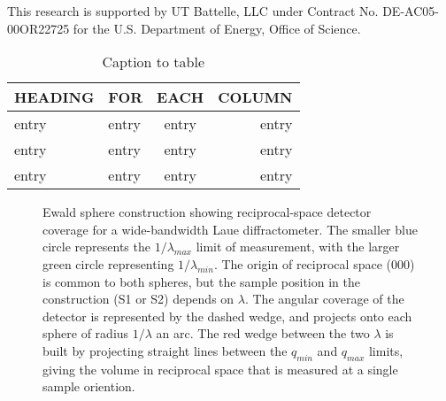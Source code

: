 \documentclass{iucr}              %
\begin{document}

This research is supported by UT Battelle, LLC under Contract No.
DE-AC05-00OR22725 for the U.S. Department of Energy, Office of Science.



     
   




\begin{table}
\caption{Caption to table}
\begin{tabular}{llcr}      %
 HEADING    & FOR        & EACH       & COLUMN     \\
\hline
 entry      & entry      & entry      & entry      \\
 entry      & entry      & entry      & entry      \\
 entry      & entry      & entry      & entry      \\
\end{tabular}
\end{table}





\begin{figure}
\caption{Ewald sphere construction showing reciprocal-space detector coverage
for a wide-bandwidth Laue diffractometer. The smaller blue circle represents the
$1/\lambda_{max}$ limit of measurement, with the larger green circle
representing $1/\lambda_{min}$. The origin of reciprocal space (000) is common to both
spheres, but the sample position in the construction (S1 or S2) depends on
$\lambda$. The angular coverage of the detector is represented by the dashed
wedge, and projects onto each sphere of radius $1/\lambda$ an arc. The red wedge
between the two $\lambda$ is built by projecting straight lines between the
$q_{min}$ and $q_{max}$ limits, giving the volume in reciprocal space that is
measured at a single sample oriention. }
\label{fig:ewald_fig} 
\end{figure}
 
\end{document}
